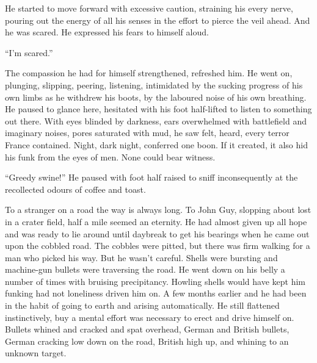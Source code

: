 He started to move forward with excessive caution, straining his every nerve, pouring out the energy of all his senses in the effort to pierce the veil ahead. And he was scared. He expressed his fears to himself aloud.

``I'm scared.''

The compassion he had for himself strengthened, refreshed him. He went on, plunging, slipping, peering, listening, intimidated by the sucking progress of his own limbs as he withdrew his boots, by the laboured noise of his own breathing. He paused to glance here, hesitated with his foot half-lifted to listen to something out there. With eyes blinded by darkness, ears overwhelmed with battlefield and imaginary noises, pores saturated with mud, he saw felt, heard, every terror France contained. Night, dark night, conferred one boon. If it created, it also hid his funk from the eyes of men. None could bear witness.

``Greedy swine!'' He paused with foot half raised to sniff inconsequently at the recollected odours of coffee and toast.

To a stranger on a road the way is always long. To John Guy, slopping about lost in a crater field, half a mile seemed an eternity. He had almost given up all hope and was ready to lie around until daybreak to get his bearings when he came out upon the cobbled road. The cobbles were pitted, but there was firm walking for a man who picked his way. But he wasn't careful. Shells were bursting and machine-gun bullets were traversing the road. He went down on his belly a number of times with bruising precipitancy. Howling shells would have kept him funking had not loneliness driven him on. A few months earlier and he had been in the habit of going to earth and arising automatically. He still flattened instinctively, buy a mental effort was necessary to erect and drive himself on. Bullets whined and cracked and spat overhead, German and British bullets, German cracking low down on the road, British high up, and whining to an unknown target.

